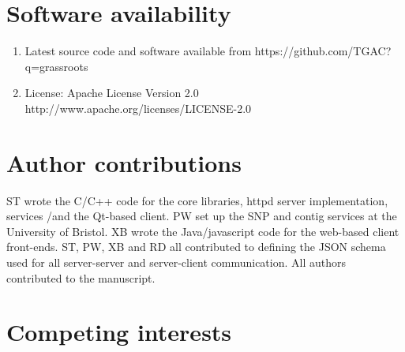 \documentclass[9pt,a4paper]{extarticle}
\begin{document}
\section*{Software availability}

\begin{enumerate}
\item Latest source code and software available from https://github.com/TGAC?q=grassroots
\item License: Apache License Version 2.0 http://www.apache.org/licenses/LICENSE-2.0
\end{enumerate}

\section*{Author contributions}
ST wrote the C/C++ code for the core libraries, httpd server implementation, services /and the Qt-based client.
PW set up the SNP and contig services at the University of Bristol.
XB wrote the Java/javascript code for the web-based client front-ends.
ST, PW, XB and RD all contributed to defining the JSON schema used for all server-server and server-client communication.
All authors contributed to the manuscript.


\section*{Competing interests}
\end{document}
